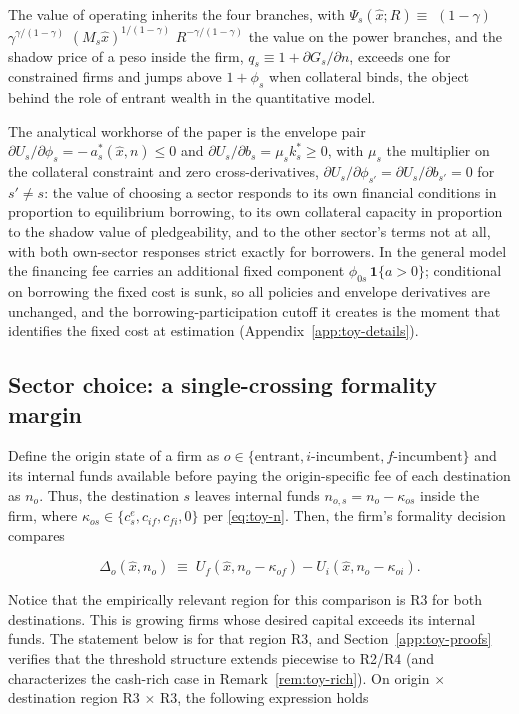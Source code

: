 \documentclass[12pt]{article}
\begin{document}
The value of operating inherits the four branches, with $\Psi_s(\hat{x}; R) \equiv$ $(1-\gamma)\,$ $\gamma^{\gamma/(1-\gamma)}$ $(M_s \hat{x})^{1/(1-\gamma)}$ $R^{-\gamma/(1-\gamma)}$ the value on the power branches, and the shadow price of a peso inside the firm, $q_s \equiv 1 + \partial G_s/\partial n$, exceeds one for constrained firms and jumps above $1+\phi_s$ when collateral binds, the object behind the role of entrant wealth in the quantitative model. 

The analytical workhorse of the paper is the envelope pair $\partial U_s/\partial \phi_s = -\,a_s^*(\hat{x}, n) \le 0$ and $\partial U_s/\partial b_s = \mu_s k_s^* \ge 0$, with $\mu_s$ the multiplier on the collateral constraint and zero cross-derivatives, $\partial U_s/\partial \phi_{s'} = \partial U_s/\partial b_{s'} = 0$ for $s' \ne s$: the value of choosing a sector responds to its own financial conditions in proportion to equilibrium borrowing, to its own collateral capacity in proportion to the shadow value of pledgeability, and to the other sector's terms not at all, with both own-sector responses strict exactly for borrowers. In the general model the financing fee carries an additional fixed component $\phi_{0s}\,\mathbf{1}\{a>0\}$; conditional on borrowing the fixed cost is sunk, so all policies and envelope derivatives are unchanged, and the borrowing-participation cutoff it creates is the moment that identifies the fixed cost at estimation (Appendix~\ref{app:toy-details}).
 
\subsection{Sector choice: a single-crossing formality margin}
\label{sec:toy-sorting}

Define the origin state of a firm as $o\in\{\text{entrant},i\text{-incumbent}, f\text{-incumbent}\}$ and its internal funds available before paying the origin-specific fee of each destination as $n_{o}$. Thus, the destination $s$ leaves internal funds $n_{o,s}=n_{o}-\kappa_{os}$ inside the firm, where $\kappa_{os}\in\{c^e_{s},c_{i f},c_{f i},0\}$ per \eqref{eq:toy-n}. Then, the firm's formality decision compares

\begin{equation}
  \Delta_{o}(\hat x,n_{o}) \;\equiv\;
  U_{f}(\hat x,n_{o}-\kappa_{of})
  -U_{i}(\hat x,n_{o}-\kappa_{oi}) .
  \label{eq:toy-Delta}
\end{equation}

Notice that the empirically relevant region for this comparison is R3 for both destinations. This is growing firms whose desired capital exceeds its internal funds. The statement below is for that region R3, and Section~\ref{app:toy-proofs} verifies that the threshold structure extends piecewise to R2/R4 (and characterizes the cash-rich case in Remark~\ref{rem:toy-rich}). On origin $\times$ destination region R3 $\times$ R3, the following expression holds
 
\end{document}

